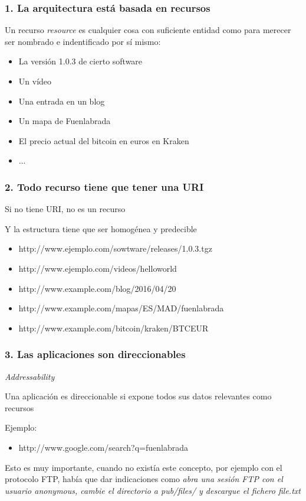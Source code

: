 \documentclass[ucs]{beamer}
\begin{document}
\begin{frame}[fragile]
\frametitle{1. La arquitectura está basada en recursos}
Un recurso \emph{resource} 
es cualquier cosa con suficiente entidad como para merecer ser nombrado e indentificado
por sí mismo:

\begin{itemize}
\item
La versión 1.0.3 de cierto software
\item
Un vídeo
\item
Una entrada en un blog
\item
Un mapa de Fuenlabrada
\item
El precio actual del bitcoin en euros en Kraken
\item
...
\end{itemize}

\end{frame}


\begin{frame}[fragile]
\frametitle{2. Todo recurso tiene que tener una URI}
Si no tiene URI, no es un recurso

Y la estructura tiene que ser homogénea y predecible
\begin{itemize}
\item
http://www.ejemplo.com/sowtware/releases/1.0.3.tgz
\item
http://www.ejemplo.com/videos/helloworld
\item
http://www.example.com/blog/2016/04/20
\item
http://www.example.com/mapas/ES/MAD/fuenlabrada
\item
http://www.example.com/bitcoin/kraken/BTCEUR
\end{itemize}

\end{frame}



\begin{frame}[fragile]
\frametitle{3. Las aplicaciones son direccionables}
\emph{Addressability}

Una aplicación  es direccionable si expone todos sus datos relevantes
como recursos

Ejemplo:
\begin{itemize}
\item
http://www.google.com/search?q=fuenlabrada
\end{itemize}

Esto es muy importante, cuando no existía este concepto, por ejemplo con el protocolo FTP,
había que dar indicaciones como
\emph{abra una sesión FTP con el usuario anonymous, cambie el directorio a pub/files/ y descargue
el fichero file.txt}

\end{frame}
\end{document}
